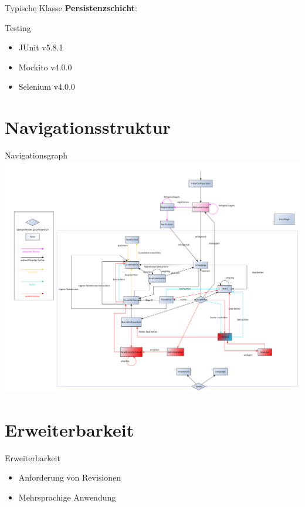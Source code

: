 \documentclass{beamer}
\begin{document}
\begin{frame}{Typische Klasse \textbf{Persistenzschicht}:}
        \begin{frame}{Testing}
            \begin{itemize}
                \item JUnit v5.8.1
                \item Mockito v4.0.0
                \item Selenium v4.0.0
            \end{itemize}
        \end{frame}


        \section{Navigationsstruktur}
        \begin{frame}{Navigationsgraph}
            \centering
            \includegraphics[height=0.8\textheight]{../../docs/Pflichtenheft/graphics/benutzerFlussyEd-png}
        \end{frame}


        \section{Erweiterbarkeit}

        \begin{frame}{Erweiterbarkeit}
            \pause
            \begin{itemize}
                \item Anforderung von Revisionen
                \pause
                \item Mehrsprachige Anwendung
            \end{itemize}
        \end{frame}


\end{frame}
\end{document}
